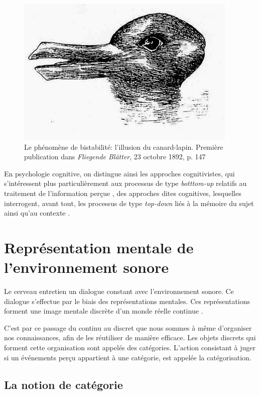 \begin{figure}[bth]
        \myfloatalign
        \includegraphics[width=.6\linewidth]{gfx/canard_lapin}
        \caption[Le phénomène de bistabilité: l'illusion du canard-lapin]{Le phénomène de bistabilité: l'illusion du canard-lapin. Première publication dans \emph{Fliegende Blätter}, 23 octobre 1892, p. 147}\label{fig:bistabilite}
\end{figure}

En psychologie cognitive, on distingue ainsi les approches cognitivistes, qui s'intéressent plus particulièrement aux processus de type \emph{botttom-up} relatifs au traitement de l'information perçue , des approches dites cognitives, lesquelles interrogent, avant tout, les processus de type \emph{top-down} liés à la mémoire du sujet ainsi qu'au contexte \citep[p. ??]{guastavino_etude_2003}.

\section{Représentation mentale de l'environnement sonore}

Le cerveau entretien un dialogue constant avec l'environnement sonore. Ce dialogue s'effectue par le biais des représentations mentales. Ces représentations forment une image mentale discrète d'un monde réelle continue \citep{houde1998vocabulaire}. 

C'est par ce passage du continu au discret que nous sommes à même d'organiser nos connaissances, afin de les réutiliser de manière efficace. Les objets discrets qui forment cette organisation sont appelés des catégories. L'action consistant à juger si un événements perçu appartient à une catégorie, est appelée la catégorisation.

\subsection{La notion de catégorie}

